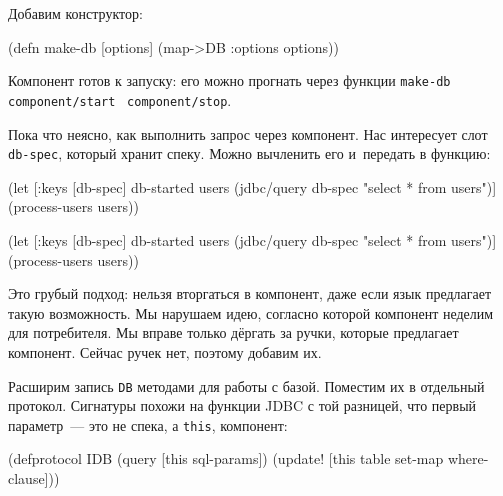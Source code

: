 \fi

\noindent
Добавим конструктор:

\begin{english}
  \begin{clojure}
(defn make-db [options]
  (map->DB {:options options}))
  \end{clojure}
\end{english}

Компонент готов к запуску: его можно прогнать через функции
\verb|make-db|~\arr{} \texttt{component\-/start}~\arr{} \verb|component/stop|.

Пока что неясно, как выполнить запрос через компонент. Нас интересует слот
\verb|db-spec|, который хранит спеку. Можно вычленить его и~передать в функцию:

\ifx\DEVICETYPE\MOBILE

\begin{english}
  \begin{clojure}
(let [{:keys [db-spec]} db-started
      users (jdbc/query db-spec
              "select * from users")]
  (process-users users))
  \end{clojure}
\end{english}

\else

\begin{english}
  \begin{clojure}
(let [{:keys [db-spec]} db-started
      users (jdbc/query db-spec "select * from users")]
  (process-users users))
  \end{clojure}
\end{english}

\fi

Это грубый подход: нельзя вторгаться в компонент, даже если язык предлагает
такую возможность. Мы нарушаем идею, согласно которой компонент неделим для
потребителя. Мы вправе только дёргать за ручки, которые предлагает
компонент. Сейчас ручек нет, поэтому добавим их.

Расширим запись \verb|DB| методами для работы с базой. Поместим их в отдельный
протокол. Сигнатуры похожи на функции JDBC с той разницей, что первый параметр~---
это не спека, а \verb|this|, компонент:


\ifx\DEVICETYPE\MOBILE

\begin{english}
  \begin{clojure}
(defprotocol IDB
  (query [this sql-params])
  (update!
    [this table set-map where-clause]))
  \end{clojure}
\end{english}

